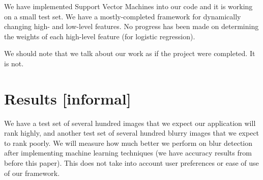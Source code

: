 \documentclass[10pt,twocolumn]{article}
\begin{document}
We have implemented Support Vector Machines into our code and it is working on a small test set. We have a mostly-completed framework for dynamically changing high- and low-level features. No progress has been made on determining the weights of each high-level feature (for logistic regression).

We should note that we talk about our work as if the project were completed. It is not.


\section{Results [informal]}
We have a test set of several hundred images that we expect our application will rank highly, and another test set of several hundred blurry images that we expect to rank poorly. We will measure how much better we perform on blur detection after implementing machine learning techniques (we have accuracy results from before this paper). This does not take into account user preferences or ease of use of our framework.




\end{document}
